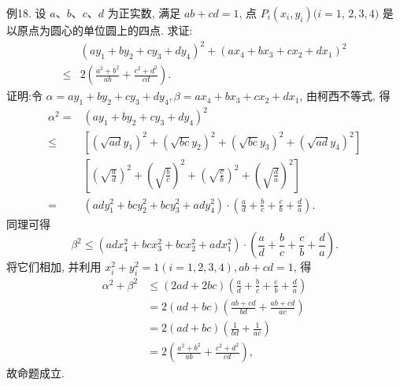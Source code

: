 例18. 设 $a 、 b 、 c 、 d$ 为正实数, 满足 $a b+c d=1$, 点 $P_i\left(x_i, y_i\right)(i=1$, $2,3,4)$ 是以原点为圆心的单位圆上的四点.
求证:
$$
\begin{aligned}
& \left(a y_1+b y_2+c y_3+d y_4\right)^2+\left(a x_4+b x_3+c x_2+d x_1\right)^2 \\
\leqslant & 2\left(\frac{a^2+b^2}{a b}+\frac{c^2+d^2}{c d}\right) .
\end{aligned}
$$
证明:令 $\alpha=a y_1+b y_2+c y_3+d y_4, \beta=a x_4+b x_3+c x_2+d x_1$, 由柯西不等式, 得
$$
\begin{aligned}
\alpha^2= & \left(a y_1+b y_2+c y_3+d y_4\right)^2 \\
\leqslant & {\left[\left(\sqrt{a d} y_1\right)^2+\left(\sqrt{b c} y_2\right)^2+\left(\sqrt{b c} y_3\right)^2+\left(\sqrt{a d} y_4\right)^2\right] } \\
& {\left[\left(\sqrt{\frac{a}{d}}\right)^2+\left(\sqrt{\frac{b}{c}}\right)^2+\left(\sqrt{\frac{c}{b}}\right)^2+\left(\sqrt{\frac{d}{a}}\right)^2\right] } \\
= & \left(a d y_1^2+b c y_2^2+b c y_3^2+a d y_4^2\right) \cdot\left(\frac{a}{d}+\frac{b}{c}+\frac{c}{b}+\frac{d}{a}\right) .
\end{aligned}
$$
同理可得
$$
\beta^2 \leqslant\left(a d x_4^2+b c x_3^2+b c x_2^2+a d x_1^2\right) \cdot\left(\frac{a}{d}+\frac{b}{c}+\frac{c}{b}+\frac{d}{a}\right) .
$$
将它们相加, 并利用 $x_i^2+y_i^2=1(i=1,2,3,4), a b+c d=1$, 得
$$
\begin{aligned}
\alpha^2+\beta^2 & \leqslant(2 a d+2 b c)\left(\frac{a}{d}+\frac{b}{c}+\frac{c}{b}+\frac{d}{a}\right) \\
& =2(a d+b c)\left(\frac{a b+c d}{b d}+\frac{a b+c d}{a c}\right) \\
& =2(a d+b c)\left(\frac{1}{b d}+\frac{1}{a c}\right) \\
& =2\left(\frac{a^2+b^2}{a b}+\frac{c^2+d^2}{c d}\right),
\end{aligned}
$$
故命题成立.



